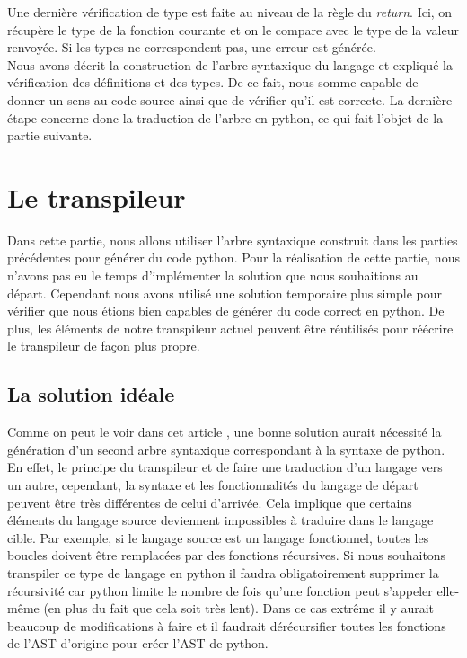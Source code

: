 \documentclass[a4paper]{article}%
\begin{document}
Une dernière vérification de type est faite au niveau de la règle du
\textit{return}. Ici, on récupère le type de la fonction courante et on le
compare avec le type de la valeur renvoyée. Si les types ne correspondent pas,
une erreur est générée.\\

Nous avons décrit la construction de l'arbre syntaxique du langage et expliqué
la vérification des définitions et des types. De ce fait, nous somme capable de
donner un sens au code source ainsi que de vérifier qu'il est correcte. La
dernière étape concerne donc la traduction de l'arbre en python, ce qui fait
l'objet de la partie suivante.

\clearpage
\section{Le transpileur}

Dans cette partie, nous allons utiliser l'arbre syntaxique construit dans les
parties précédentes pour générer du code python. Pour la réalisation de cette
partie, nous n'avons pas eu le temps d'implémenter la solution que nous
souhaitions au départ. Cependant nous avons utilisé une solution temporaire
plus simple pour vérifier que nous étions bien capables de générer du code
correct en python. De plus, les éléments de notre transpileur actuel peuvent
être réutilisés pour réécrire le transpileur de façon plus propre.

\subsection{La solution idéale}

Comme on peut le voir dans cet article \cite{tutotranspiler}, une bonne solution
aurait nécessité la génération d'un second arbre syntaxique correspondant à la
syntaxe de python. En effet, le principe du transpileur et de faire une
traduction d'un langage vers un autre, cependant, la syntaxe et les
fonctionnalités du langage de départ peuvent être très différentes de celui
d'arrivée. Cela implique que certains éléments du langage source deviennent
impossibles à traduire dans le langage cible. Par exemple, si le langage source
est un langage fonctionnel, toutes les boucles doivent être remplacées par des
fonctions récursives. Si nous souhaitons transpiler ce type de langage en python
il faudra obligatoirement supprimer la récursivité car python limite le
nombre de fois qu'une fonction peut s'appeler elle-même (en plus du fait que
cela soit très lent). Dans ce cas extrême il y aurait beaucoup de modifications
à faire et il faudrait dérécursifier toutes les fonctions de l'AST d'origine
pour créer l'AST de python.
\end{document}
